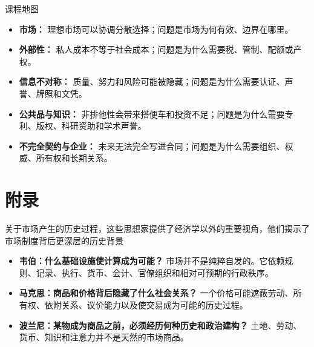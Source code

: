 \documentclass[UTF8,10pt,a4paper,scheme=chinese,fontset=none]{ctexart}
\begin{document}
\begin{keybox}{课程地图}
\begin{itemize}
  \item \textbf{市场：} 理想市场可以协调分散选择；问题是市场为何有效、边界在哪里。
  \item \textbf{外部性：} 私人成本不等于社会成本；问题是为什么需要税、管制、配额或产权。
  \item \textbf{信息不对称：} 质量、努力和风险可能被隐藏；问题是为什么需要认证、声誉、牌照和文凭。
  \item \textbf{公共品与知识：} 非排他性会带来搭便车和投资不足；问题是为什么需要专利、版权、科研资助和学术声誉。
  \item \textbf{不完全契约与企业：} 未来无法完全写进合同；问题是为什么需要组织、权威、所有权和长期关系。
\end{itemize}
\end{keybox}

\section{附录}
关于市场产生的历史过程，这些思想家提供了经济学以外的重要视角，他们揭示了市场制度背后更深层的历史背景
\begin{itemize}
  \item \textbf{韦伯：什么基础设施使计算成为可能？} 市场并不是纯粹自发的。它依赖规则、记录、执行、货币、会计、官僚组织和相对可预期的行政秩序。
  \item \textbf{马克思：商品和价格背后隐藏了什么社会关系？} 一个价格可能遮蔽劳动、所有权、依附关系、议价能力以及使交易成为可能的历史过程。
  \item \textbf{波兰尼：某物成为商品之前，必须经历何种历史和政治建构？} 土地、劳动、货币、知识和注意力并不是天然的市场商品。
\end{itemize}


\end{document}
